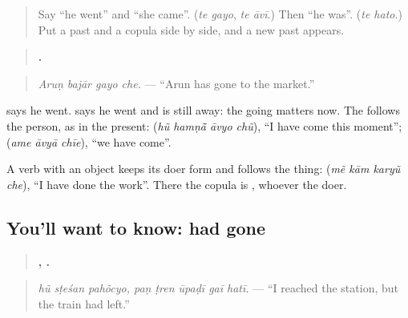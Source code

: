 \label{lesson:GU-C273-gayo-che}



\begin{quote}
Say \textquotedblleft{}he went\textquotedblright{} and \textquotedblleft{}she came\textquotedblright{}. (\emph{te gayo}, \emph{te āvī}.) Then \textquotedblleft{}he was\textquotedblright{}. (\emph{te hato}.) Put a past and a copula side by side, and a new past appears.
\end{quote}

\begin{grammarlens}[title={Grammar Lens: has gone}]
\begin{quote}
\textbf{   .}
\end{quote}

\begin{quote}
\emph{Aruṇ bajār gayo che.} — \textquotedblleft{}Arun has gone to the market.\textquotedblright{}
\end{quote}

\textbf{} says he went. \textbf{ } says he went and is still away: the going matters now. The \textbf{} follows the person, as in the present: \textbf{   } (\emph{hũ hamṇā̃ āvyo chũ}), \textquotedblleft{}I have come this moment\textquotedblright{}; \textbf{  } (\emph{ame āvyā chīe}), \textquotedblleft{}we have come\textquotedblright{}.

A verb with an object keeps its doer form and follows the thing: \textbf{   } (\emph{mẽ kām karyũ che}), \textquotedblleft{}I have done the work\textquotedblright{}. There the copula is \textbf{}, whoever the doer.
\end{grammarlens}

\subsection*{You'll want to know: had gone}
\begin{quote}
\textbf{  ,     .}
\end{quote}

\begin{quote}
\emph{hũ sṭeśan pahõcyo, paṇ ṭren ūpaḍī gaī hatī.} — \textquotedblleft{}I reached the station, but the train had left.\textquotedblright{}
\end{quote}

